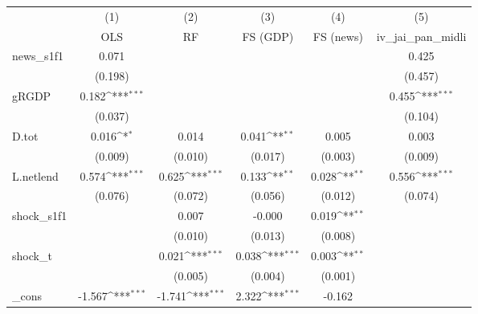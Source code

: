 {
\def\sym#1{\ifmmode^{#1}\else\(^{#1}\)\fi}
\begin{tabular}{l*{5}{c}}
\toprule
            &\multicolumn{1}{c}{(1)}&\multicolumn{1}{c}{(2)}&\multicolumn{1}{c}{(3)}&\multicolumn{1}{c}{(4)}&\multicolumn{1}{c}{(5)}\\
            &\multicolumn{1}{c}{OLS}&\multicolumn{1}{c}{RF}&\multicolumn{1}{c}{FS (GDP)}&\multicolumn{1}{c}{FS (news)}&\multicolumn{1}{c}{iv\_jai\_pan\_midli}\\
\midrule
news\_s1f1   &       0.071         &                     &                     &                     &       0.425         \\
            &     (0.198)         &                     &                     &                     &     (0.457)         \\
\addlinespace
gRGDP       &       0.182\sym{***}&                     &                     &                     &       0.455\sym{***}\\
            &     (0.037)         &                     &                     &                     &     (0.104)         \\
\addlinespace
D.tot       &       0.016\sym{*}  &       0.014         &       0.041\sym{**} &       0.005         &       0.003         \\
            &     (0.009)         &     (0.010)         &     (0.017)         &     (0.003)         &     (0.009)         \\
\addlinespace
L.netlend   &       0.574\sym{***}&       0.625\sym{***}&       0.133\sym{**} &       0.028\sym{**} &       0.556\sym{***}\\
            &     (0.076)         &     (0.072)         &     (0.056)         &     (0.012)         &     (0.074)         \\
\addlinespace
shock\_s1f1  &                     &       0.007         &      -0.000         &       0.019\sym{**} &                     \\
            &                     &     (0.010)         &     (0.013)         &     (0.008)         &                     \\
\addlinespace
shock\_t     &                     &       0.021\sym{***}&       0.038\sym{***}&       0.003\sym{**} &                     \\
            &                     &     (0.005)         &     (0.004)         &     (0.001)         &                     \\
\addlinespace
\_cons      &      -1.567\sym{***}&      -1.741\sym{***}&       2.322\sym{***}&      -0.162         &                     \\

\end{tabular}}
